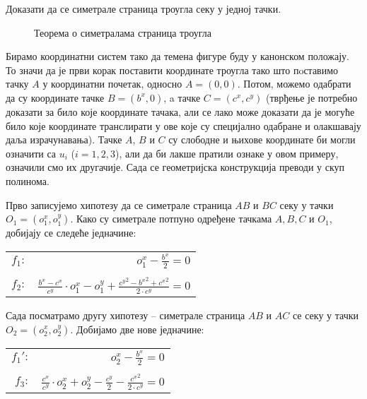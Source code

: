 \begin{primer}
Доказати да се симетрале страница троугла секу
  у једној тачки.
\begin{figure}[hb]
\begin{center}

\end{center}
\caption{Теорема о симетралама страница троугла} \label{fig:simetrale_stranica}
\end{figure}


Бирамо координатни систем тако да темена фигуре буду у канонском
положају. То значи да је први корак поставити координате троугла тако
што пoставимо тачку $A$ у координатни почетак, односно $A = (0,
0)$. Потом, можемо одабрати да су координате тачке $B = (b^x, 0)$, a
тачке $C = (c^x, c^y)$ (тврђење је потребно доказати за било које
координате тачака, али се лако може доказати да је могуће било које
координате транслирати у ове које су специјално одабране и олакшавају
даља израчунавања). Тачке $A$, $B$ и $C$ су слободне и њихове
координате би могли означити са $u_i$ ($i = 1, 2, 3$), али да би лакше
пратили ознаке у овом примеру, означили смо их другачије. Сада се
геометријска конструкција преводи у скуп полинома.

Прво записујемо хипотезу да се симетрале страница $AB$ и $BC$ секу у
тачки $O_1 = (o^x_{1}, o^y_{1})$. Како су симетрале потпуно одређене тачкама
$A, B, C$ и $O_1$, добијају се следеће једначине:

\medskip
\begin{center}
 \begin{tabular}{rr}
$f_1:$ & $o^x_{1} - \frac{b^x}{2} = 0$\\
{} & {}\\
$f_2:$ & $\frac{b^x - c^x}{c^y}\cdot o^x_{1} - o^y_{1} + \frac{{c^y}^2 - {b^x}^2 + {c^x}^2}{2\cdot c^y} = 0$
\end{tabular}
\end{center}

\medskip

Сада посматрамо другу хипотезу -- симетрале страница $AB$ и $AC$ се
секу у тачки $O_2 = (o^x_{2}, o^y_{2})$. Добијамо две нове једначине:

\medskip
\begin{center}
 \begin{tabular}{rr}
$f_1':$ & $o^x_{2} - \frac{b^x}{2} = 0$\\
{} & {}\\
$f_3:$ & $\frac{c^x}{c^y}\cdot o^x_{2} + o^y_{2} - \frac{c^y}{2} - \frac{{c^x}^2}{2\cdot c^y} = 0$
\end{tabular}
\end{center}


\end{primer}
